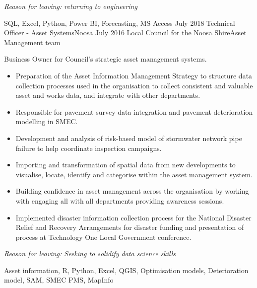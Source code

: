 \begin{experiences}
{\begin{itemize}
                      \end{itemize}
                     \textit{Reason for leaving: returning to engineering}  
                    }
                    {SQL, Excel, Python, Power BI, Forecasting, MS Access}
  \emptySeparator
  \consultantexperience
    {July 2018} {Technical Officer - Asset Systems}{}{Noosa}
    {July 2016}   {Local Council for the Noosa Shire}{Asset Management team}
      {Business Owner for Council's strategic asset management systems.
                      \begin{itemize}
		\item Preparation of the Asset Information Management Strategy to structure data collection processes used in the organisation to collect consistent and valuable asset and works data, and integrate with other departments.
		\item Responsible for pavement survey data integration and pavement deterioration modelling in SMEC.
		\item Development and analysis of risk-based model of stormwater network pipe failure  to help coordinate inspection campaigns.
		\item Importing and transformation of spatial data from new developments to visualise, locate, identify and categorise within the asset management system.
		\item Building confidence in asset management across the organisation by working with engaging all with all departments providing awareness sessions.
		\item Implemented disaster information collection process for the National Disaster Relief and Recovery Arrangements for disaster funding and presentation of process at Technology One Local Government conference.                                
                      \end{itemize}
                       \textit{Reason for leaving: Seeking to solidify data science skills}
                    }
                    {Asset information, R, Python, Excel, QGIS, Optimisation models, Deterioration model, SAM, SMEC PMS, MapInfo}
  \emptySeparator
  

\end{experiences}
